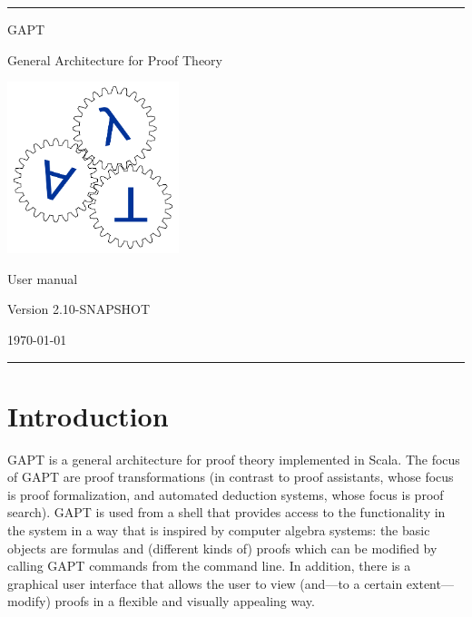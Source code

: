 \documentclass[a4paper,11pt]{book}
\begin{document}
\begin{titlepage}
\begin{center}

\hrule

\vspace*{20mm}

{\Huge GAPT}

\vspace*{5mm}

{\huge General Architecture for Proof Theory}

\vspace*{20mm}

\includegraphics[keepaspectratio,width=5cm]{logo}

\vspace*{20mm}

{\Huge User manual}

\vspace*{10mm}
{\Large Version 2.10-SNAPSHOT}
\vspace*{10mm}

{\Large \today}

\vspace*{20mm}

\hrule
\end{center}

\end{titlepage}

\listoffixmes

\setcounter{tocdepth}{1}
\tableofcontents

\chapter{Introduction}

GAPT is a general architecture for proof theory implemented in Scala.
The focus of GAPT are proof transformations (in contrast to proof assistants,
whose focus is proof formalization, and automated deduction systems, whose focus
is proof search). GAPT is used from a shell that provides access to the functionality
in the system in a way that is inspired by computer algebra systems: the basic
objects are formulas and (different kinds of) proofs which can be modified
by calling GAPT commands from the command line. In addition, there
is a graphical user interface that allows the user to view (and—to a certain extent—
modify) proofs in a flexible and visually appealing way.
\end{document}
